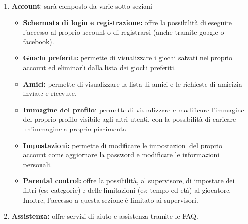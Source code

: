 \documentclass[../Report.tex]{subfiles}
\begin{document}
\begin{enumerate}
        \item \textbf{Account:} sarà composto da varie sotto sezioni
        \begin{itemize}
            \item \textbf{Schermata di login e registrazione:} offre la possibilità di eseguire l'accesso al proprio account o di registrarsi (anche tramite google o facebook).
            \item \textbf{Giochi preferiti:} permette di visualizzare i giochi salvati nel proprio account ed eliminarli dalla lista dei giochi preferiti.
            \item \textbf{Amici:} permette di visualizzare la lista di amici e le richieste di amicizia inviate e ricevute.
            \item \textbf{Immagine del profilo:} permette di visualizzare e modificare l'immagine del proprio profilo visibile agli altri utenti, con la possibilità di caricare un'immagine a proprio piacimento.
            \item \textbf{Impostazioni:} permette di modificare le impostazioni del proprio account come aggiornare la password e modificare le informazioni personali.
            \item \textbf{Parental control:} offre la possibilità, al supervisore, di impostare dei filtri (es: categorie) e delle limitazioni (es: tempo ed età) al giocatore. Inoltre, l'accesso a questa sezione è limitato ai supervisori.
        \end{itemize}
        \item \textbf{Assistenza:} offre servizi di aiuto e assistenza tramite le FAQ.
    \end{enumerate}
\end{document}
